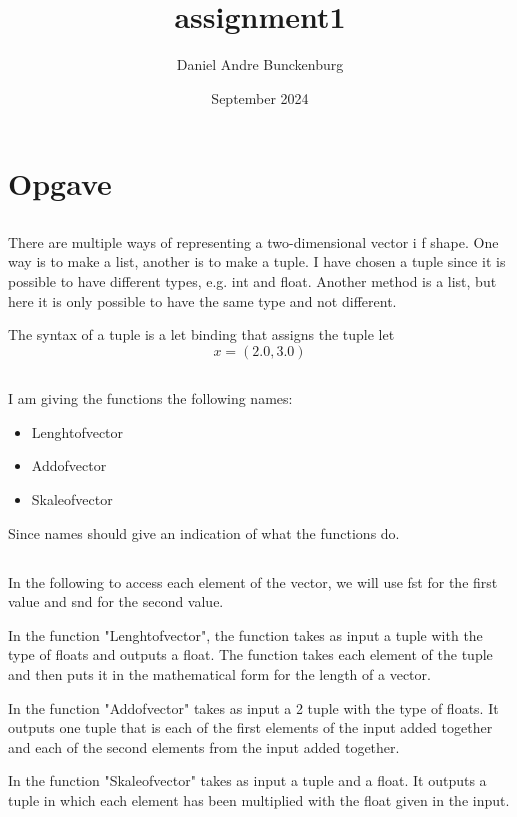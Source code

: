 \documentclass{article}
\title{assignment1}
\author{Daniel Andre Bunckenburg}
\date{September 2024}
\begin{document}
\section{Opgave}
\subsection{}

There are multiple ways of representing a two-dimensional vector i f shape. One way is to make a list, another is to make a tuple. I have chosen a tuple since it is possible to have different types, e.g. int and float. Another method is a list, but here it is only possible to have the same type and not different. 

The syntax of a tuple is a let binding that assigns the tuple let $$ x = (2.0, 3.0)$$


\subsection{}
I am giving the functions the following names:

\begin{itemize}
  \item Lenghtofvector
  \item Addofvector
  \item Skaleofvector
\end{itemize}
Since names should give an indication of what the functions do. 

\subsection{}

In the following to access each element of the vector, we will use fst for the first value and snd for the second value.

In the function "Lenghtofvector", the function takes as input a tuple with the type of floats and outputs a float. The function takes each element of the tuple and then puts it in the mathematical form for the length of a vector.

In the function "Addofvector" takes as input a 2 tuple with the type of floats. It outputs one tuple that is each of the first elements of the input added together and each of the second elements from the input added together.

In the function "Skaleofvector" takes as input a tuple and a float. It outputs a tuple in which each element has been multiplied with the float given in the input.
\end{document}
